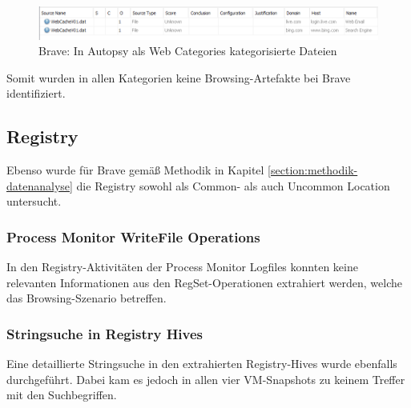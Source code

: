 \begin{appendices}

\begin{figure}[h!]
	\centering
	\includegraphics[width=\textwidth]{bilder/BRCat.png}
	\caption{Brave: In Autopsy als \glqq{}Web Categories\grqq{} kategorisierte Dateien}
	\label{img:brave-web-categories}  
\end{figure}

Somit wurden in allen Kategorien keine Browsing-Artefakte bei Brave identifiziert.

\subsection{Registry}\label{chap:anhang-brave-registry}

Ebenso wurde für Brave gemäß Methodik in Kapitel \ref{section:methodik-datenanalyse} die Registry sowohl als Common- als auch Uncommon Location untersucht.

\subsubsection*{Process Monitor WriteFile Operations}\label{chap:anhang-brave-common-locations-registry}
In den Registry-Aktivitäten der Process Monitor Logfiles konnten  keine relevanten Informationen aus den RegSet-Operationen extrahiert werden, welche das Browsing-Szenario betreffen.

\subsubsection*{Stringsuche in Registry Hives}\label{chap:anhang-brave-uncommon-locations-registry}
Eine detaillierte Stringsuche in den extrahierten Registry-Hives wurde ebenfalls durchgeführt. Dabei kam es jedoch in allen vier VM-Snapshots zu keinem Treffer mit den Suchbegriffen.

\end{appendices}